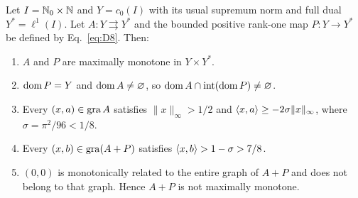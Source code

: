 \label{sec:c0}
\label{sec:statements}
\begin{example}[A counterexample on $c_0$]\label{thm:C}
Let $I=\mathbb N_0\times\mathbb N$ and $Y=c_0(I)$ with its usual supremum norm and
full dual $Y^*=\ell^1(I)$. Let $A:Y\rightrightarrows Y^*$ and the bounded
positive rank-one map $P:Y\to Y^*$ be defined by Eq.~\eqref{eq:D8}.
Then:
\begin{enumerate}
\item $A$ and $P$ are maximally monotone in $Y\times Y^*$.
\item $\operatorname{dom} P=Y$ and $\operatorname{dom} A\ne\varnothing$, so
$\operatorname{dom} A\cap\operatorname{int}(\operatorname{dom} P)\ne\varnothing$.
\item Every $(x,a)\in\operatorname{gra} A$ satisfies $\|x\|_\infty>1/2$ and
$\langle x,a\rangle\ge-2\sigma\|x\|_\infty$, where $\sigma=\pi^2/96<1/8$.
\item Every $(x,b)\in\operatorname{gra}(A+P)$ satisfies
$\langle x,b\rangle>1-\sigma>7/8$.
\item $(0,0)$ is monotonically related to the entire graph of $A+P$ and
does not belong to that graph. Hence $A+P$ is not maximally monotone.
\end{enumerate}
\end{example}
